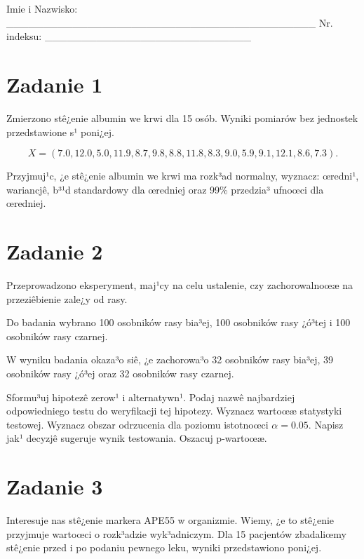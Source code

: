 \documentclass[a4paper,12pt]{article}
\begin{document}
 Imie i Nazwisko: \_\_\_\_\_\_\_\_\_\_\_\_\_\_\_\_\_\_\_\_\_\_\_\_\_\_\_\_\_\_\_\_\_\_\_\_\_\_\_\_\_\_ Nr. indeksu: \_\_\_\_\_\_\_\_\_\_\_\_\_\_\_\_\_\_\_\_\_\_\_\_\_\_\_\_ 
 \section*{Zadanie 1}
     
     Zmierzono stê¿enie albumin we krwi dla 15 osób. 
     Wyniki pomiarów bez jednostek przedstawione s¹ poni¿ej. 
     
     \noindent $$X=(  7.0, 12.0,  5.0, 11.9,  8.7,  9.8,  8.8, 11.8,  8.3,  9.0,  5.9,  9.1, 12.1,  8.6,  7.3 ).$$
     
     Przyjmuj¹c, ¿e stê¿enie albumin we krwi ma rozk³ad normalny, 
     wyznacz: œredni¹, wariancjê, b³¹d standardowy dla œredniej oraz 99\% przedzia³ ufnoœci dla œredniej. \vspace{1cm} 

  \section*{Zadanie 2}
     
  Przeprowadzono eksperyment, maj¹cy na celu ustalenie, czy zachorowalnoœæ na przeziêbienie zale¿y od rasy.
  
  Do badania wybrano 100 osobników rasy bia³ej, 100 osobników rasy ¿ó³tej i 100 osobników rasy czarnej. 
  
  W wyniku badania okaza³o siê, ¿e zachorowa³o 32 osobników rasy bia³ej, 39 osobników rasy ¿ó³ej oraz 32 osobników rasy czarnej. 
  
  Sformu³uj hipotezê zerow¹ i alternatywn¹. 
  Podaj nazwê najbardziej odpowiedniego testu do weryfikacji tej hipotezy. 
  Wyznacz wartoœæ statystyki testowej. 
  Wyznacz obszar odrzucenia dla poziomu istotnoœci $\alpha=0.05$. 
  Napisz jak¹ decyzjê sugeruje wynik testowania. Oszacuj p-wartoœæ. \vspace{1cm} 

  \section*{Zadanie 3}
     
  Interesuje nas stê¿enie markera APE55  w organizmie. 
  Wiemy, ¿e to stê¿enie przyjmuje wartoœci o rozk³adzie wyk³adniczym. 
  Dla 15 pacjentów zbadaliœmy stê¿enie przed i po podaniu pewnego leku, 
  wyniki przedstawiono poni¿ej.
  
\end{document}

